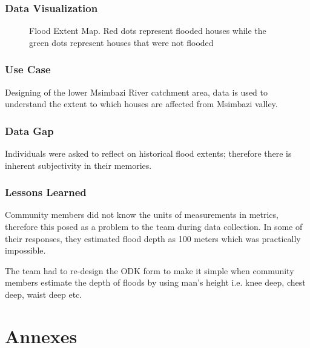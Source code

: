 \documentclass[a4paper,12pt,twoside]{article}
\begin{document}
\subsubsection{Data Visualization}
\begin{figure}[h]
  \color{RHgreen}\caption{Flood Extent Map. Red dots represent flooded houses while the green dots represent houses that were not flooded}
  \centering
\end{figure}

\subsubsection{Use Case}
Designing of the lower Msimbazi River catchment area, data is used to understand the extent to which houses are affected from Msimbazi valley.

\subsubsection{Data Gap}
Individuals were asked to reflect on historical flood extents; therefore there is inherent subjectivity in their memories.

\subsubsection{Lessons Learned}
Community members did not know the units of measurements in metrics, therefore this posed as a problem to the team during data collection. In some of their responses, they estimated flood depth as 100 meters which was practically impossible.

The team had to re-design the ODK form to make it simple when community members estimate the depth of floods by using man’s height i.e. knee deep, chest deep, waist deep etc.



\newpage
\section{Annexes}
\end{document}
